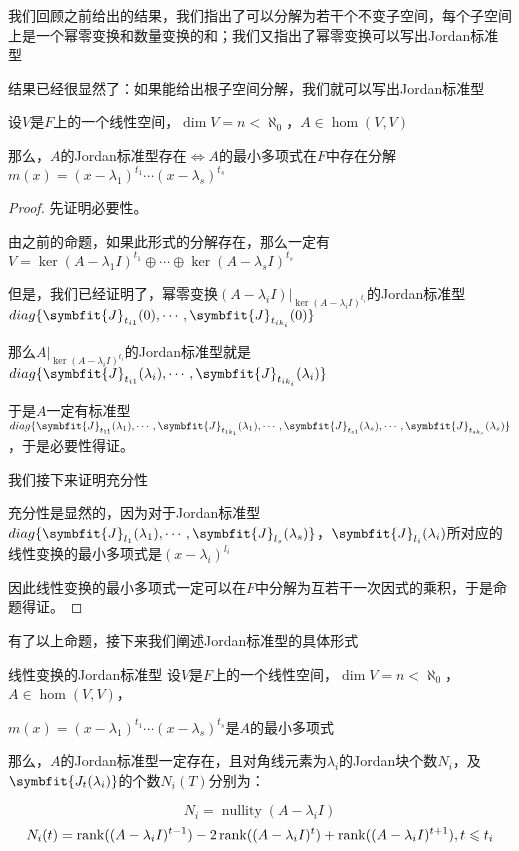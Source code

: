 \documentclass[12pt, a4paper, oneside, UTF8]{ctexbook}
\begin{document}
			我们回顾之前给出的结果，我们指出了可以分解为若干个不变子空间，每个子空间上是一个幂零变换和数量变换的和；我们又指出了幂零变换可以写出Jordan标准型

			结果已经很显然了：如果能给出根子空间分解，我们就可以写出Jordan标准型
			\begin{proposition}
				设$V$是$F$上的一个线性空间，$\dim V = n < \aleph_0$，$A \in \hom(V,V)$
							
				那么，$A$的Jordan标准型存在$ \Leftrightarrow A$的最小多项式在$F$中存在分解$m(x)=(x-\lambda_1)^{t_1}\cdots (x-\lambda_s)^{t_s}$
			\end{proposition}
			\begin{proof}
				先证明必要性。

				由之前的命题，如果此形式的分解存在，那么一定有$V = \ker (A-\lambda_1 I)^{t_1}\oplus \cdots \oplus \ker (A-\lambda_s I)^{t_s}$

				但是，我们已经证明了，幂零变换$(A-\lambda_i I)|_{\ker (A-\lambda_i I)^{t_i}}$的Jordan标准型$diag\{\symbfit{J}_{t_{i1}}(0),\cdots,\symbfit{J}_{t_{ik_i}}(0)\}$

				那么$A|_{\ker (A-\lambda_i I)^{t_i}}$的Jordan标准型就是$diag\{\symbfit{J}_{t_{i1}}(\lambda_i),\cdots,\symbfit{J}_{t_{ik_i}}(\lambda_i)\}$

				于是$A$一定有标准型$diag\{\symbfit{J}_{t_{11}}(\lambda_1),\cdots,\symbfit{J}_{t_{1k_1}}(\lambda_1),\cdots,\symbfit{J}_{t_{s1}}(\lambda_s),\cdots,\symbfit{J}_{t_{sk_s}}(\lambda_s)\}$，于是必要性得证。

				我们接下来证明充分性

				充分性是显然的，因为对于Jordan标准型$diag\{\symbfit{J}_{l_1}(\lambda_1),\cdots,\symbfit{J}_{l_s}(\lambda_s)\}$，$\symbfit{J}_{l_i}(\lambda_i)$所对应的线性变换的最小多项式是$(x-\lambda_i)^{l_i}$

				因此线性变换的最小多项式一定可以在$F$中分解为互若干一次因式的乘积，于是命题得证。
			\end{proof}
			有了以上命题，接下来我们阐述Jordan标准型的具体形式
			\begin{them}{线性变换的Jordan标准型}{}
				设$V$是$F$上的一个线性空间，$\dim V = n < \aleph_0$，$A \in \hom(V,V)$，
							
				$m(x)=(x-\lambda_1)^{t_1}\cdots (x-\lambda_s)^{t_s}$是$A$的最小多项式

				那么，$A$的Jordan标准型一定存在，且对角线元素为$\lambda_i$的Jordan块个数$N_i$，及$\symbfit{J_{t}(\lambda_i)}$的个数$N_i(T)$分别为：

				\begin{equation}
					N_i = \operatorname{nullity}(A-\lambda_i I)
				\end{equation}
				\begin{equation}
					N_i(t) = \operatorname{rank}((A-\lambda_i I)^{t-1})-2\operatorname{rank}((A-\lambda_i I)^t)+\operatorname{rank}((A-\lambda_i I)^{t+1}),t \leqslant t_i
				\end{equation}
			\end{them}
\end{document}

